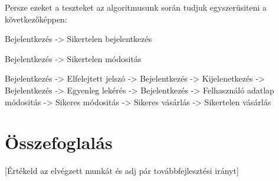 \documentclass[12pt]{article}
\begin{document}
Persze ezeket a teszteket az algoritmusunk során tudjuk egyszerüsiteni a következőképpen:

\item Bejelentkezés -> Sikertelen bejelentkezés
\item Bejelentkezés -> Sikertelen módositás
\item Bejelentkezés -> Elfelejtett jelszó -> Bejelentkezés -> Kijelenetkezés -> Bejelentkezés -> Egyenleg lekérés -> Bejelentkezés -> Felhasználó adatlap módositás -> Sikeres módositás -> Sikeres vásárlás -> Sikertelen vásárlás

\section{Összefoglalás}
[Értékeld az elvégzett munkát és adj pár továbbfejlesztési irányt]


\newpage


\end{document}

